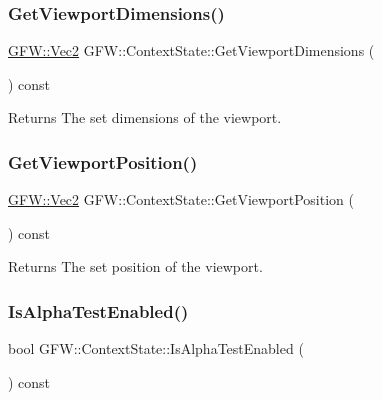 \subsubsection{\texorpdfstring{Get\+Viewport\+Dimensions()}{GetViewportDimensions()}}
{\footnotesize\ttfamily \hyperlink{namespace_g_f_w_1_1_math_af5ba989006b289f1e575dd7a911c1521}{G\+F\+W\+::\+Vec2} G\+F\+W\+::\+Context\+State\+::\+Get\+Viewport\+Dimensions (\begin{DoxyParamCaption}{ }\end{DoxyParamCaption}) const}

\begin{DoxyReturn}{Returns}
The set dimensions of the viewport. 
\end{DoxyReturn}
\mbox{\label{class_g_f_w_1_1_context_state_ab152d162bb24377f81b0bf612f1b89b7}} 
\subsubsection{\texorpdfstring{Get\+Viewport\+Position()}{GetViewportPosition()}}
{\footnotesize\ttfamily \hyperlink{namespace_g_f_w_1_1_math_af5ba989006b289f1e575dd7a911c1521}{G\+F\+W\+::\+Vec2} G\+F\+W\+::\+Context\+State\+::\+Get\+Viewport\+Position (\begin{DoxyParamCaption}{ }\end{DoxyParamCaption}) const}

\begin{DoxyReturn}{Returns}
The set position of the viewport. 
\end{DoxyReturn}
\mbox{\label{class_g_f_w_1_1_context_state_aa46202064aa37cf14a1db6be93de6ad6}} 
\subsubsection{\texorpdfstring{Is\+Alpha\+Test\+Enabled()}{IsAlphaTestEnabled()}}
{\footnotesize\ttfamily bool G\+F\+W\+::\+Context\+State\+::\+Is\+Alpha\+Test\+Enabled (\begin{DoxyParamCaption}{ }\end{DoxyParamCaption}) const}


